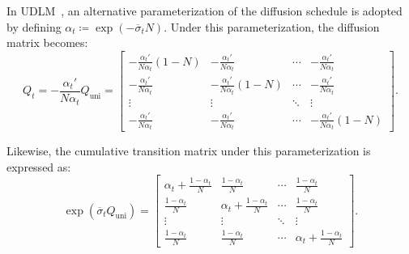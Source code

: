         In UDLM~\citep{schiff2024discreteguidance}, an alternative parameterization of the diffusion schedule is adopted by defining $\alpha_t \coloneqq \exp(-\overline{\sigma}_t N)$. Under this parameterization, the diffusion matrix becomes:
        \begin{equation}
            Q_t = -\frac{\alpha_t'}{N\alpha_t} Q_{\text{uni}} =
            \begin{bmatrix}
                - \frac{\alpha_t'}{N\alpha_t}(1 - N) & -\frac{\alpha_t'}{N\alpha_t} & \cdots & -\frac{\alpha_t'}{N\alpha_t} \\
                -\frac{\alpha_t'}{N\alpha_t} & -\frac{\alpha_t'}{N\alpha_t}(1 - N) & \cdots & -\frac{\alpha_t'}{N\alpha_t} \\
                \vdots & \vdots & \ddots & \vdots \\
                -\frac{\alpha_t'}{N\alpha_t} & -\frac{\alpha_t'}{N\alpha_t} & \cdots & -\frac{\alpha_t'}{N\alpha_t}(1 - N)
            \end{bmatrix}.
        \end{equation}
        
        Likewise, the cumulative transition matrix under this parameterization is expressed as:
        \begin{equation}
            \exp(\overline{\sigma}_t Q_{\text{uni}}) =
            \begin{bmatrix}
                \alpha_t + \frac{1 - \alpha_t}{N} & \frac{1 - \alpha_t}{N} & \cdots & \frac{1 - \alpha_t}{N} \\
                \frac{1 - \alpha_t}{N} & \alpha_t + \frac{1 - \alpha_t}{N} & \cdots & \frac{1 - \alpha_t}{N} \\
                \vdots & \vdots & \ddots & \vdots \\
                \frac{1 - \alpha_t}{N} & \frac{1 - \alpha_t}{N} & \cdots & \alpha_t + \frac{1 - \alpha_t}{N}
            \end{bmatrix}.
        \end{equation}

